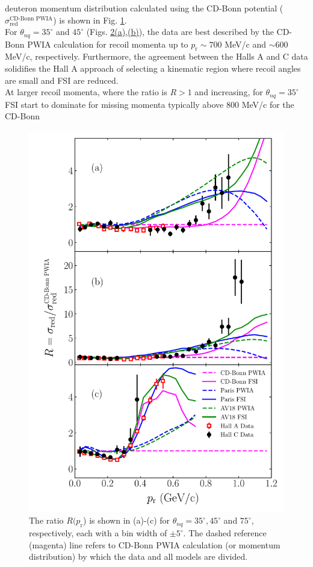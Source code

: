 deuteron momentum distribution  calculated using the CD-Bonn potential ($\sigma^{\text{CD-Bonn PWIA}}_{\mathrm{red}}$) \cite{PhysRevC.63.024001} is shown in Fig. \ref{fig:fig2}. \\
\indent For $\theta_{nq}=35^{\circ}$ and $45^{\circ}$ (Figs. \hyperref[fig:fig2]{2(a),(b)}), the data are best described by the CD-Bonn PWIA calculation for recoil momenta up
to $p_{\mathrm{r}}\sim700$ MeV/c and $\sim600$ MeV/c, respectively. Furthermore, the agreement between the Halls A and C data solidifies the Hall A approach of selecting a kinematic
region where recoil angles are small and FSI are reduced. \\
\indent At larger recoil momenta, where the ratio is $R>1$ and increasing, for $\theta_{nq}=35^{\circ}$ FSI start to dominate for
missing momenta typically above 800 MeV/c for the CD-Bonn
\begin{figure}[t!]
\includegraphics[scale=0.5]{./prl_plots/PRL_plot2.pdf}
\caption{The ratio $R(p_{\mathrm{r}}$) is shown in (a)-(c) for $\theta_{nq}=35^{\circ}, 45^{\circ}$ and $75^{\circ}$, respectively, each with a bin width of $\pm 5^{\circ}$.
The dashed reference (magenta) line refers to CD-Bonn PWIA calculation (or momentum distribution) by which the data and all models are divided.}
\label{fig:fig2}
\end{figure}
